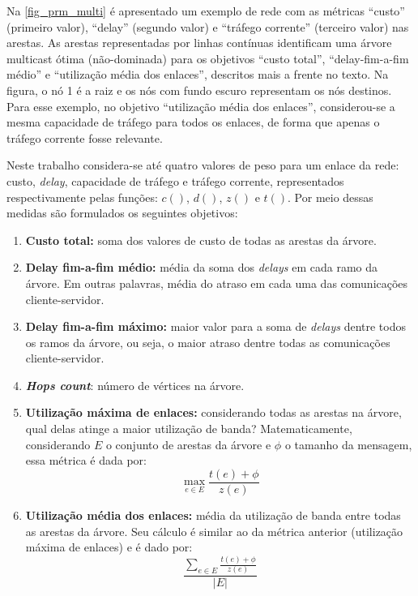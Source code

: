 Na \autoref{fig_prm_multi} é apresentado um exemplo de rede com as métricas ``custo'' (primeiro valor), ``delay'' (segundo valor) e ``tráfego corrente'' (terceiro valor) nas arestas. As arestas representadas por linhas contínuas identificam uma árvore multicast ótima (não-dominada) para os objetivos ``custo total'', ``delay-fim-a-fim médio'' e ``utilização média dos enlaces'', descritos mais a frente no texto. Na figura, o nó 1 é a raiz e os nós com fundo escuro representam os nós destinos. Para esse exemplo, no objetivo ``utilização média dos enlaces'', considerou-se a mesma capacidade de tráfego para todos os enlaces, de forma que apenas o tráfego corrente fosse relevante.

Neste trabalho considera-se até quatro valores de peso para um enlace da rede: custo, \textit{delay}, capacidade de tráfego e tráfego corrente, representados respectivamente pelas funções: $c()$, $d()$, $z()$ e $t()$. Por meio dessas medidas são formulados os seguintes objetivos:

\begin{enumerate} 
	\item \textbf{Custo total:} soma dos valores de custo de todas as arestas da árvore.
	\item \textbf{Delay fim-a-fim médio:} média da soma dos \textit{delays} em cada ramo da árvore. Em outras palavras, média do atraso em cada uma das comunicações cliente-servidor.
	\item \textbf{Delay fim-a-fim máximo:} maior valor para a soma de \textit{delays} dentre todos os ramos da árvore, ou seja, o maior atraso dentre todas as comunicações cliente-servidor.
	\item \textbf{\textit{Hops count}}: número de vértices na árvore.
	\item \textbf{Utilização máxima de enlaces:} considerando todas as arestas na árvore, qual delas atinge a maior utilização de banda? Matematicamente, considerando $E$ o conjunto de arestas da árvore e $\phi$ o tamanho da mensagem, essa métrica é dada por:
	\begin{equation}\max_{e \in E} \frac{t(e) + \phi}{z(e)}\end{equation}
	\item \textbf{Utilização média dos enlaces:} média da utilização de banda entre todas as arestas da árvore. Seu cálculo é similar ao da métrica anterior (utilização máxima de enlaces) e é dado por:
	\begin{equation}\frac{\sum_{e \in E} \frac{t(e) + \phi}{z(e)}}{|E|}\end{equation}
\end{enumerate}

